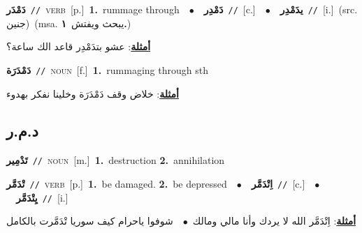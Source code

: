 \documentclass[10pt,a4paper,twoside]{article} %
\begin{document}
\begin{multicols}{2}
{\setlength\topsep{0pt}\textbf{\foreignlanguage{arabic}{دَمْدَر}}\ {\color{gray}\texttt{//}\color{black}}\ \textsc{verb}\ [p.]\ \textbf{1.}~rummage through\ \ $\bullet$\ \ \setlength\topsep{0pt}\textbf{\foreignlanguage{arabic}{دَمْدِر}}\ {\color{gray}\texttt{//}\color{black}}\ [c.]\ \ $\bullet$\ \ \setlength\topsep{0pt}\textbf{\foreignlanguage{arabic}{يدَمْدِر}}\ {\color{gray}\texttt{//}\color{black}}\ [i.]\ (src. \color{gray}\foreignlanguage{arabic}{جنين}\color{black})\ \color{gray}(msa. \foreignlanguage{arabic}{يبحث ويفتش}~\foreignlanguage{arabic}{\textbf{١.}})\color{black}\  \begin{flushright}\color{gray}\foreignlanguage{arabic}{\textbf{\underline{\foreignlanguage{arabic}{أمثلة}}}: عشو بتدَمْدِر قاعد الك ساعة؟}\end{flushright}\color{black}} \vspace{2mm}

{\setlength\topsep{0pt}\textbf{\foreignlanguage{arabic}{دَمْدَرَة}}\ {\color{gray}\texttt{//}\color{black}}\ \textsc{noun}\ [f.]\ \textbf{1.}~rummaging through sth\  \begin{flushright}\color{gray}\foreignlanguage{arabic}{\textbf{\underline{\foreignlanguage{arabic}{أمثلة}}}: خلاض وقف دَمْدَرَة وخلينا نفكر بهدوء}\end{flushright}\color{black}} \vspace{2mm}

\vspace{-3mm}
\subsection*{\color{blue}\foreignlanguage{arabic}{د.م.ر}\color{blue}{}} 

{\setlength\topsep{0pt}\textbf{\foreignlanguage{arabic}{تَدْمِير}}\ {\color{gray}\texttt{//}\color{black}}\ \textsc{noun}\ [m.]\ \textbf{1.}~destruction  \textbf{2.}~annihilation\ } \vspace{2mm}

{\setlength\topsep{0pt}\textbf{\foreignlanguage{arabic}{تْدَمَّر}}\ {\color{gray}\texttt{//}\color{black}}\ \textsc{verb}\ [p.]\ \textbf{1.}~be damaged.  \textbf{2.}~be depressed\ \ $\bullet$\ \ \setlength\topsep{0pt}\textbf{\foreignlanguage{arabic}{اِتْدَمَّر}}\ {\color{gray}\texttt{//}\color{black}}\ [c.]\ \ $\bullet$\ \ \setlength\topsep{0pt}\textbf{\foreignlanguage{arabic}{يِتْدَمَّر}}\ {\color{gray}\texttt{//}\color{black}}\ [i.]\  \begin{flushright}\color{gray}\foreignlanguage{arabic}{\textbf{\underline{\foreignlanguage{arabic}{أمثلة}}}: اِتْدَمَّر الله لا يردك وأنا مالي ومالك\ $\bullet$\ \  شوفوا ياحرام كيف سوريا تْدَمَّرت بالكامل}\end{flushright}\color{black}} \vspace{2mm}


\end{multicols}
\end{document}
